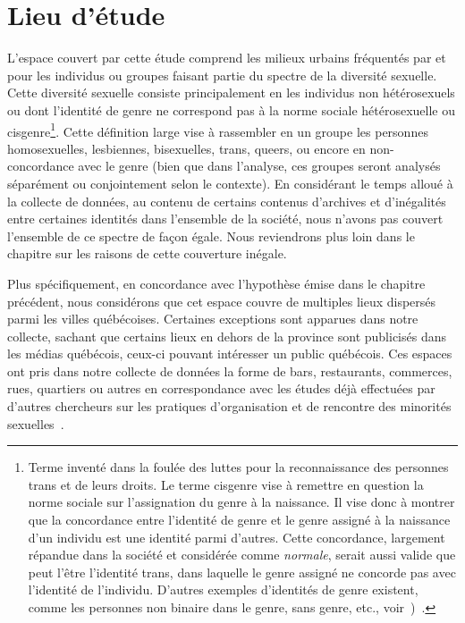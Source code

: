 \section{Lieu d'étude}
\label{sec:lieu_d_tude}
L'espace couvert par cette étude comprend les milieux urbains fréquentés par et pour les individus ou groupes faisant partie du spectre de la diversité sexuelle. 
Cette diversité sexuelle consiste principalement en les individus non hétérosexuels ou dont l'identité de genre ne correspond pas à la norme sociale hétérosexuelle ou cisgenre\footnote{Terme inventé dans la foulée des luttes pour la reconnaissance des personnes trans et de leurs droits. 
Le terme cisgenre vise à remettre en  question la norme sociale sur l'assignation du genre à la naissance.
Il vise donc à montrer que la concordance entre l'identité de genre et le genre assigné à la naissance d'un individu est une identité parmi d'autres. 
Cette concordance, largement répandue dans la société et considérée comme \emph{normale}, serait aussi valide que peut l'être l'identité  trans, dans laquelle le genre assigné ne concorde pas avec l'identité de l'individu.
D'autres exemples d'identités de genre existent, comme les personnes non binaire dans le genre, sans genre, etc., voir~\cite{Barker2015})~\citep[150]{McGeeney2015}.}. 
Cette définition large vise à rassembler en un groupe les personnes homosexuelles, lesbiennes, bisexuelles, trans, queers, ou encore en non-concordance avec le genre (bien que dans l'analyse, ces groupes seront analysés séparément ou conjointement selon le contexte). 
En considérant le temps alloué à la collecte de données, au contenu de certains contenus d'archives et d'inégalités entre certaines identités dans l'ensemble de la société, nous n'avons pas couvert l'ensemble de ce spectre de façon égale. 
Nous reviendrons plus loin dans le chapitre sur les raisons de cette couverture inégale.

Plus spécifiquement, en concordance avec l'hypothèse émise dans le chapitre précédent, nous considérons que cet espace couvre de multiples lieux dispersés parmi les villes québécoises.
Certaines exceptions sont apparues dans notre collecte, sachant que certains lieux en dehors de la province sont publicisés dans les médias québécois, ceux-ci pouvant intéresser un public québécois. 
Ces espaces ont pris dans notre collecte de données la forme de bars, restaurants, commerces, rues, quartiers ou autres en correspondance avec les études déjà effectuées par d'autres chercheurs sur les pratiques d'organisation et de rencontre des minorités sexuelles~\citep{Higgins1999,Hinrichs2012}.

